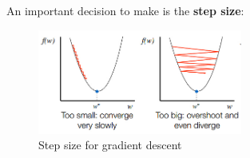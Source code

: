 An important decision to make is the \textbf{step size}:
\begin{figure}[H]
  \centering
  \includegraphics[width=0.6\textwidth]{assets/regression/sr__learning_rate.jpg} 
  \caption{Step size for gradient descent}
  \label{fig:4_learning_rate}
\end{figure}


